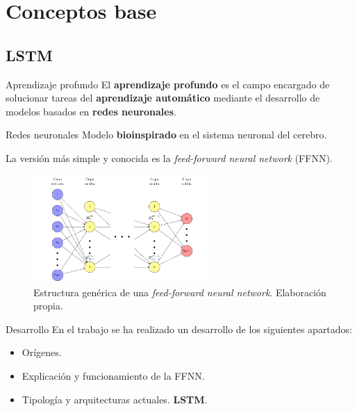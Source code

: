 \documentclass[spanish]{beamer}
\begin{document}
\section{Conceptos base}

\subsection{LSTM}

\begin{frame}{Aprendizaje profundo}
  El \textbf{aprendizaje profundo} es el campo encargado de solucionar tareas del \textbf{aprendizaje automático} mediante el desarrollo de modelos basados en \textbf{redes neuronales}.
\end{frame}

\begin{frame}{Redes neuronales}
  Modelo \textbf{bioinspirado} en el sistema neuronal del cerebro.

  \pause

  La versión más simple y conocida es la \emph{feed-forward neural network} (FFNN).

  \begin{figure}
    \centering
    \includegraphics[width=0.6\textwidth]{img/ffnn}
    \caption{Estructura genérica de una \emph{feed-forward neural network}. Elaboración propia.}
  \end{figure}
\end{frame}

\begin{frame}{Desarrollo}
  En el trabajo se ha realizado un desarrollo de los siguientes apartados:
  \begin{itemize}
    \item Orígenes.
    \item Explicación y funcionamiento de la FFNN.
    \item Tipología y arquitecturas actuales. \textbf{LSTM}.
  \end{itemize}

\end{frame}
\end{document}
